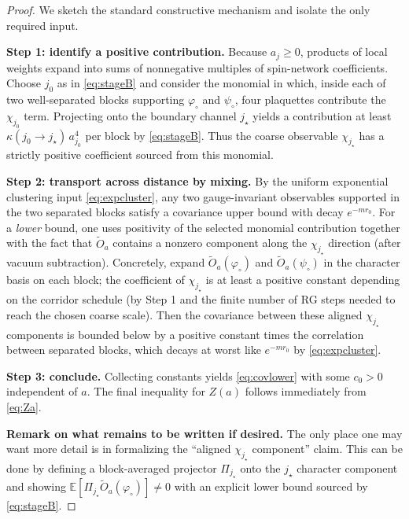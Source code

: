 \documentclass[11pt]{article}
\theoremstyle{definition}
\newcommand{\E}{\mathbb{E}}
\newcommand{\1}{\mathbf{1}}
\begin{document}
\begin{proof}
We sketch the standard constructive mechanism and isolate the only required input.

\smallskip
\noindent
\textbf{Step 1: identify a positive contribution.}
Because $a_j\ge 0$, products of local weights expand into sums of nonnegative multiples of spin-network coefficients. Choose $j_0$ as in \eqref{eq:stageB} and consider the monomial in which, inside each of two well-separated blocks supporting $\varphi_\circ$ and $\psi_\circ$, four plaquettes contribute the $\chi_{j_0}$ term.
Projecting onto the boundary channel $j_\star$ yields a contribution at least
$\kappa(j_0\to j_\star)\,a_{j_0}^4$ per block by \eqref{eq:stageB}.
Thus the coarse observable $\chi_{j_\star}$ has a strictly positive coefficient sourced from this monomial.

\smallskip
\noindent
\textbf{Step 2: transport across distance by mixing.}
By the uniform exponential clustering input \eqref{eq:expcluster}, any two gauge-invariant observables supported in the two separated blocks satisfy a covariance upper bound with decay $e^{-m r_0}$. For a \emph{lower} bound, one uses positivity of the selected monomial contribution together with the fact that $\widetilde O_a$ contains a nonzero component along the $\chi_{j_\star}$ direction (after vacuum subtraction).
Concretely, expand $\widetilde O_a(\varphi_\circ)$ and $\widetilde O_a(\psi_\circ)$ in the character basis on each block; the coefficient of $\chi_{j_\star}$ is at least a positive constant depending on the corridor schedule (by Step 1 and the finite number of RG steps needed to reach the chosen coarse scale).
Then the covariance between these aligned $\chi_{j_\star}$ components is bounded below by a positive constant times the correlation between separated blocks, which decays at worst like $e^{-m r_0}$ by \eqref{eq:expcluster}.

\smallskip
\noindent
\textbf{Step 3: conclude.}
Collecting constants yields \eqref{eq:covlower} with some $c_0>0$ independent of $a$.
The final inequality for $Z(a)$ follows immediately from \eqref{eq:Za}.

\medskip
\noindent
\textbf{Remark on what remains to be written if desired.}
The only place one may want more detail is in formalizing the ``aligned $\chi_{j_\star}$ component'' claim.
This can be done by defining a block-averaged projector $\Pi_{j_\star}$ onto the $j_\star$ character component and showing $\E[\Pi_{j_\star}\widetilde O_a(\varphi_\circ)]\neq 0$ with an explicit lower bound sourced by \eqref{eq:stageB}.
\end{proof}
\end{document}
